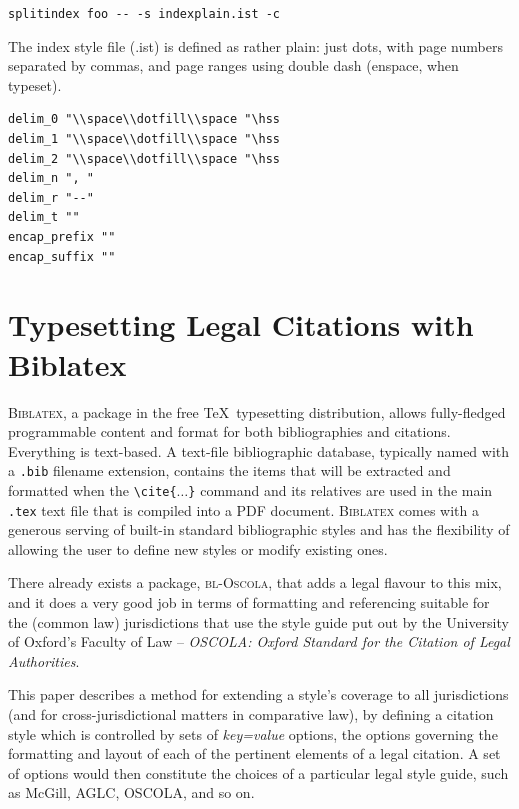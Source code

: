 \verb|splitindex foo -- -s indexplain.ist -c|
\bigskip

The index style file (.ist) is defined as rather plain: just dots, with page numbers separated by commas, and page ranges using double dash (enspace, when typeset).

\begin{verbatim}
delim_0 "\\space\\dotfill\\space "\hss
delim_1 "\\space\\dotfill\\space "\hss
delim_2 "\\space\\dotfill\\space "\hss
delim_n ", "
delim_r "--"
delim_t ""
encap_prefix ""
encap_suffix ""
\end{verbatim}


\section{Typesetting Legal Citations with Biblatex}
\textsc{Biblatex}, a package in the free \TeX\ typesetting distribution, allows fully-fledged programmable content and format for both bibliographies and citations. 
Everything is text-based. 
A text-file bibliographic database, typically named with a \texttt{.bib} filename extension, contains the items that will be extracted and formatted when the  \texttt{\textbackslash cite\{$\ldots$\}} command and its relatives are used in the main \texttt{.tex} text file that is compiled into a PDF document. \textsc{Biblatex} comes with a generous serving of built-in standard bibliographic styles and has the flexibility of allowing the user to define new styles or modify existing ones.

There already exists a package, \textsc{bl-Oscola}, that adds a legal flavour to this mix, and it does a very good job in terms of formatting and referencing suitable for the (common law) jurisdictions that use the style guide put out by the University of Oxford's Faculty of Law -- \textit{OSCOLA: Oxford Standard for the Citation of Legal Authorities}.

This paper describes a method for extending a style's coverage to all jurisdictions (and for cross-jurisdictional matters in comparative law), by defining a citation style which is controlled by sets of \textit{key=value} options, the options governing the formatting and layout of each of the pertinent elements of a legal citation. A set of options would then constitute the choices of a particular legal style guide, such as McGill, AGLC, OSCOLA, and so on. 

